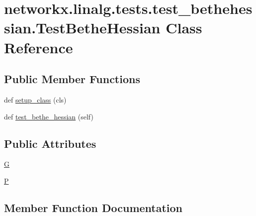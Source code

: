 \hypertarget{classnetworkx_1_1linalg_1_1tests_1_1test__bethehessian_1_1TestBetheHessian}{}\section{networkx.\+linalg.\+tests.\+test\+\_\+bethehessian.\+Test\+Bethe\+Hessian Class Reference}
\label{classnetworkx_1_1linalg_1_1tests_1_1test__bethehessian_1_1TestBetheHessian}
\subsection*{Public Member Functions}
\begin{DoxyCompactItemize}
\item 
def \hyperlink{classnetworkx_1_1linalg_1_1tests_1_1test__bethehessian_1_1TestBetheHessian_af5df9c74a6cb20d4b8af7e22c7fbd705}{setup\+\_\+class} (cls)
\item 
def \hyperlink{classnetworkx_1_1linalg_1_1tests_1_1test__bethehessian_1_1TestBetheHessian_a7657dba2d8731c211b22ac1d41c913d8}{test\+\_\+bethe\+\_\+hessian} (self)
\end{DoxyCompactItemize}
\subsection*{Public Attributes}
\begin{DoxyCompactItemize}
\item 
\hyperlink{classnetworkx_1_1linalg_1_1tests_1_1test__bethehessian_1_1TestBetheHessian_a3f64b04810eb8551ac4f97e3cbb75e86}{G}
\item 
\hyperlink{classnetworkx_1_1linalg_1_1tests_1_1test__bethehessian_1_1TestBetheHessian_ac877d5637427f8f21bd0a82024181204}{P}
\end{DoxyCompactItemize}


\subsection{Member Function Documentation}
\mbox{\label{classnetworkx_1_1linalg_1_1tests_1_1test__bethehessian_1_1TestBetheHessian_af5df9c74a6cb20d4b8af7e22c7fbd705}} 
